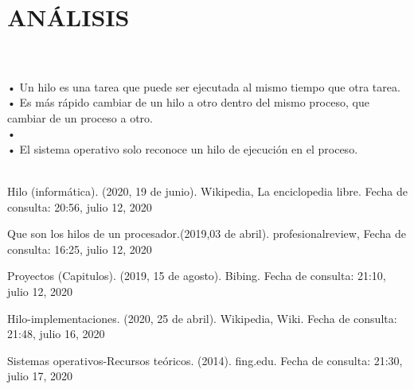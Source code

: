 \documentclass[conference]{IEEEtran}
\begin{document}
\\
\\
\section{ANÁLISIS}
\\
\\
• Un hilo es una tarea que puede ser ejecutada al mismo tiempo que otra tarea.
\\
• Es más rápido cambiar de un hilo a otro dentro del mismo proceso, que cambiar de un proceso a otro.
\\
• 
\\
• El sistema operativo solo reconoce un hilo de ejecución en el proceso.
\\
\\
\begin{thebibliography}{00}


  Hilo (informática). (2020, 19 de junio). Wikipedia, La enciclopedia libre. Fecha de consulta: 20:56, julio 12, 2020 

 Que son los hilos de un procesador.(2019,03 de abril). profesionalreview, Fecha de consulta: 16:25, julio 12, 2020 

 Proyectos (Capitulos). (2019, 15 de agosto). Bibing. Fecha de consulta: 21:10, julio 12, 2020  

  Hilo-implementaciones. (2020, 25 de abril). Wikipedia, Wiki. Fecha de consulta: 21:48, julio 16, 2020

  Sistemas operativos-Recursos teóricos. (2014). fing.edu. Fecha de consulta: 21:30, julio 17, 2020 





\end{thebibliography}
\end{document}
